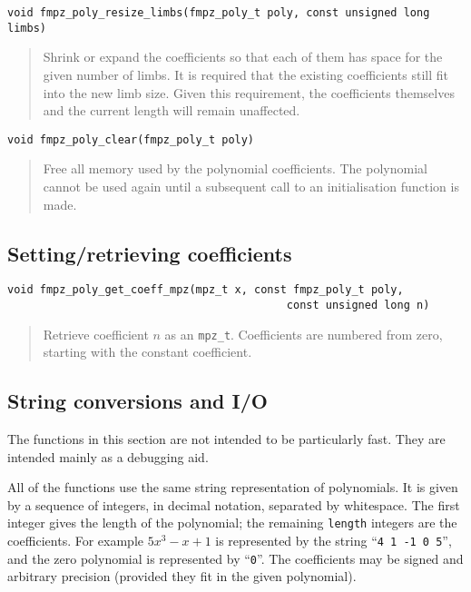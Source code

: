 \documentclass[a4paper,10pt]{article}
\newcommand{\code}{\lstinline}
\begin{document}
\begin{lstlisting}
void fmpz_poly_resize_limbs(fmpz_poly_t poly, const unsigned long limbs)
\end{lstlisting}
\begin{quote}
Shrink or expand the coefficients so that each of them has space for the given number of limbs. It is required that the existing coefficients still fit into the new limb size. Given this requirement, the coefficients themselves and the current length will remain unaffected.
\end{quote}

\begin{lstlisting}
void fmpz_poly_clear(fmpz_poly_t poly)\end{lstlisting}
\begin{quote}
Free all memory used by the polynomial coefficients. The polynomial cannot be used again until a subsequent call to an initialisation function is made.
\end{quote}

\subsection{Setting/retrieving coefficients}

\begin{lstlisting}
void fmpz_poly_get_coeff_mpz(mpz_t x, const fmpz_poly_t poly, 
                                           const unsigned long n)
\end{lstlisting}
\begin{quote}
Retrieve coefficient $n$ as an \code{mpz_t}. Coefficients are numbered from zero, starting with the constant coefficient.
\end{quote}

\subsection{String conversions and I/O}

The functions in this section are not intended to be particularly fast. They are intended mainly as a debugging aid.

All of the functions use the same string representation of polynomials. It is given by a sequence of integers, in decimal notation, separated by whitespace. The first integer gives the length of the polynomial; the remaining \code{length} integers are the coefficients. For example $5x^3 - x + 1$ is represented by the string ``\code{4 1 -1 0 5}'', and the zero polynomial is represented by ``\code{0}''. The coefficients may be signed and arbitrary precision (provided they fit in the given polynomial).
\end{document}
